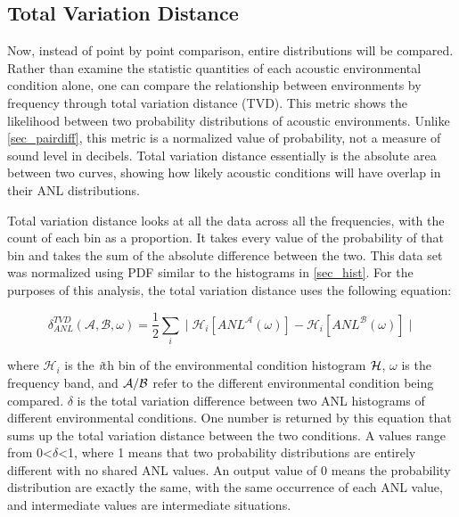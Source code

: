 \subsection{Total Variation Distance} \label{sec_tvd}

Now, instead of point by point comparison, entire distributions will be compared. Rather than examine the statistic quantities of each acoustic environmental condition alone, one can compare the relationship between environments by frequency through total variation distance (TVD). This metric shows the likelihood between two probability distributions of acoustic environments. Unlike \autoref{sec_pairdiff}, this metric is a normalized value of probability, not a measure of sound level in decibels. Total variation distance essentially is the absolute area between two curves, showing how likely acoustic conditions will have overlap in their ANL distributions. 

 Total variation distance looks at all the data across all the frequencies, with the count of each bin as a proportion. It takes every value of the probability of that bin and takes the sum of the absolute difference between the two. This data set was normalized using PDF similar to the histograms in \autoref{sec_hist}. For the purposes of this analysis, the total variation distance uses the following equation: 


\begin{equation} \label{tdv_eq}
    \delta ^{TVD} _{ANL} ( \mathcal{A}, \mathcal{B}, \omega) = \frac{1}{2} \sum _{i} ^{} \mid \mathcal{H}_{i} [ANL^{\mathcal{A}}(\omega)] -\mathcal{H}_{i} [ANL^{\mathcal{B}}(\omega)] \mid 
\end{equation}

where  $\mathcal{H}_{i}$ is the \textit{i}th bin of the environmental condition histogram $\cal{H}$, $\omega$ is the frequency band, and $\cal{A/B}$ refer to the different environmental condition being compared. $\delta$ is the total variation difference between two ANL histograms of different environmental conditions. One number is returned by this equation that sums up the total variation distance between the two conditions. A values range from 0<$\delta$<1, where 1 means that two probability distributions are entirely different with no shared ANL values. An output value of 0 means the probability distribution are exactly the same, with the same occurrence of each ANL value, and intermediate values are intermediate situations.

